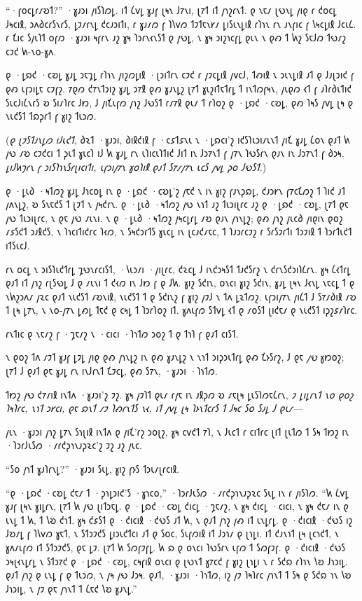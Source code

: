 “·𐑝𐑴𐑤𐑛𐑩𐑥𐑹𐑑?” ·𐑣𐑨𐑮𐑦 𐑢𐑦𐑕𐑐𐑼𐑛. 𐑦𐑑 𐑖𐑫𐑛 𐑣𐑨𐑝 𐑚𐑰𐑯 𐑓𐑳𐑯𐑦, 𐑚𐑳𐑑 𐑦𐑑 𐑢𐑪𐑟𐑩𐑯𐑑. 𐑞 𐑯𐑱𐑥 𐑚𐑻𐑯𐑛 𐑢𐑦𐑞 𐑩 𐑒𐑴𐑤𐑛 𐑓𐑰𐑤𐑦𐑙, 𐑮𐑵𐑔𐑤𐑩𐑕𐑯𐑩𐑕, 𐑛𐑲𐑥𐑩𐑯𐑛 𐑒𐑤𐑨𐑮𐑦𐑑𐑦, 𐑩 𐑣𐑨𐑥𐑼 𐑝 𐑐𐑘𐑫𐑼 𐑑𐑲𐑑𐑱𐑯𐑾𐑥 𐑛𐑦𐑕𐑧𐑯𐑛𐑦𐑙 𐑩𐑐𐑪𐑯 𐑩𐑯 𐑨𐑯𐑝𐑦𐑤 𐑝 𐑘𐑰𐑤𐑛𐑦𐑙 𐑓𐑤𐑧𐑖. 𐑩 𐑗𐑦𐑤 𐑕𐑢𐑧𐑐𐑑 𐑴𐑝𐑼 ·𐑣𐑨𐑮𐑦 𐑰𐑝𐑩𐑯 𐑨𐑟 𐑣𐑰 𐑐𐑮𐑩𐑯𐑬𐑯𐑕𐑑 𐑞 𐑢𐑻𐑛, 𐑯 𐑣𐑰 𐑮𐑦𐑟𐑪𐑤𐑝𐑛 𐑞𐑧𐑯 𐑯 𐑞𐑺 𐑑 𐑿𐑟 𐑕𐑱𐑓𐑼 𐑑𐑻𐑥𐑟 𐑤𐑲𐑒 𐑿-𐑯𐑴-𐑣𐑵.

𐑞 ·𐑛𐑸𐑒 ·𐑤𐑹𐑛 𐑣𐑨𐑛 𐑮𐑱𐑡𐑛 𐑩𐑐𐑪𐑯 𐑢𐑦𐑟𐑼𐑛𐑦𐑙 ·𐑚𐑮𐑦𐑑𐑩𐑯 𐑤𐑲𐑒 𐑩 𐑢𐑲𐑤𐑛𐑦𐑙 𐑢𐑫𐑤𐑓, 𐑑𐑺𐑦𐑙 𐑯 𐑮𐑧𐑯𐑛𐑦𐑙 𐑨𐑑 𐑞 𐑓𐑨𐑚𐑮𐑦𐑒 𐑝 𐑞𐑺 𐑧𐑝𐑮𐑦𐑛𐑱 𐑤𐑲𐑝𐑟. 𐑳𐑞𐑼 𐑒𐑳𐑯𐑑𐑮𐑦𐑟 𐑣𐑨𐑛 𐑮𐑳𐑙 𐑞𐑺 𐑣𐑨𐑯𐑛𐑟 𐑚𐑳𐑑 𐑣𐑧𐑟𐑦𐑑𐑱𐑑𐑩𐑛 𐑑 𐑦𐑯𐑑𐑼𐑝𐑰𐑯, 𐑢𐑧𐑞𐑼 𐑬𐑑 𐑝 𐑨𐑐𐑩𐑔𐑧𐑑𐑦𐑒 𐑕𐑧𐑤𐑓𐑦𐑖𐑯𐑩𐑕 𐑹 𐑕𐑦𐑥𐑐𐑩𐑤 𐑓𐑽, 𐑓 𐑢𐑦𐑗𐑧𐑝𐑼 𐑢𐑪𐑟 𐑓𐑻𐑕𐑑 𐑩𐑥𐑳𐑙 𐑞𐑧𐑥 𐑑 𐑩𐑐𐑴𐑟 𐑞 ·𐑛𐑸𐑒 ·𐑤𐑹𐑛, 𐑞𐑺 𐑐𐑰𐑕 𐑢𐑫𐑛 𐑚𐑰 𐑞 𐑯𐑧𐑒𐑕𐑑 𐑑𐑸𐑜𐑩𐑑 𐑝 𐑣𐑦𐑟 𐑑𐑧𐑮𐑼.

(\emph{𐑞 𐑚𐑲𐑕𐑑𐑨𐑯𐑛𐑼 𐑦𐑓𐑧𐑒𐑑,} 𐑔𐑷𐑑 ·𐑣𐑨𐑮𐑦, 𐑔𐑦𐑙𐑒𐑦𐑙 𐑝 ·𐑤𐑭𐑑𐑭𐑯𐑧 𐑯 ·𐑛𐑸𐑤𐑦'𐑟 𐑦𐑒𐑕𐑐𐑧𐑮𐑦𐑥𐑧𐑯𐑑 𐑢𐑦𐑗 𐑣𐑨𐑛 𐑖𐑴𐑯 𐑞𐑨𐑑 𐑿 𐑢𐑻 𐑥𐑹 𐑤𐑲𐑒𐑤𐑦 𐑑 𐑜𐑧𐑑 𐑣𐑧𐑤𐑐 𐑦𐑓 𐑿 𐑣𐑨𐑛 𐑩𐑯 𐑧𐑐𐑦𐑤𐑧𐑐𐑑𐑦𐑒 𐑓𐑦𐑑 𐑦𐑯 𐑓𐑮𐑳𐑯𐑑 𐑝 𐑢𐑳𐑯 𐑐𐑻𐑕𐑩𐑯 𐑞𐑨𐑯 𐑦𐑯 𐑓𐑮𐑳𐑯𐑑 𐑝 𐑔𐑮𐑰. \emph{𐑛𐑦𐑓𐑿𐑠𐑩𐑯 𐑝 𐑮𐑦𐑕𐑐𐑪𐑯𐑕𐑩𐑚𐑦𐑤𐑦𐑑𐑦, 𐑧𐑝𐑮𐑦𐑢𐑳𐑯 𐑣𐑴𐑐𐑦𐑙 𐑞𐑨𐑑 𐑕𐑳𐑥𐑢𐑳𐑯 𐑧𐑤𐑕 𐑢𐑫𐑛 𐑜𐑴 𐑓𐑻𐑕𐑑.})

𐑞 ·𐑛𐑧𐑔 ·𐑰𐑑𐑼𐑟 𐑣𐑨𐑛 𐑓𐑪𐑤𐑴𐑛 𐑦𐑯 𐑞 ·𐑛𐑸𐑒 ·𐑤𐑹𐑛'𐑟 𐑢𐑱𐑒 𐑯 𐑦𐑯 𐑣𐑦𐑟 𐑝𐑨𐑯𐑜𐑸𐑛, 𐑒𐑨𐑮𐑾𐑯 𐑝𐑳𐑤𐑗𐑼𐑟 𐑑 𐑐𐑦𐑒 𐑨𐑑 𐑢𐑵𐑯𐑛𐑟, 𐑹 𐑕𐑯𐑱𐑒𐑕 𐑑 𐑚𐑲𐑑 𐑯 𐑢𐑰𐑒𐑩𐑯. 𐑞 ·𐑛𐑧𐑔 ·𐑰𐑑𐑼𐑟 𐑢𐑻 𐑯𐑪𐑑 𐑨𐑟 𐑑𐑧𐑮𐑦𐑚𐑩𐑤 𐑨𐑟 𐑞 ·𐑛𐑸𐑒 ·𐑤𐑹𐑛, 𐑚𐑳𐑑 𐑞𐑱 𐑢𐑻 𐑑𐑧𐑮𐑦𐑚𐑩𐑤, 𐑯 𐑞𐑱 𐑢𐑻 𐑥𐑧𐑯𐑦. 𐑯 𐑞 ·𐑛𐑧𐑔 ·𐑰𐑑𐑼𐑟 𐑢𐑰𐑤𐑛𐑩𐑛 𐑥𐑹 𐑞𐑨𐑯 𐑢𐑪𐑯𐑛𐑟; 𐑞𐑺 𐑢𐑪𐑟 𐑢𐑧𐑤𐑔 𐑢𐑦𐑞𐑦𐑯 𐑞𐑴𐑟 𐑥𐑭𐑕𐑒𐑑 𐑮𐑨𐑙𐑒𐑕, 𐑯 𐑐𐑪𐑤𐑦𐑑𐑦𐑒𐑩𐑤 𐑐𐑬𐑼, 𐑯 𐑕𐑰𐑒𐑮𐑩𐑑𐑕 𐑣𐑧𐑤𐑛 𐑦𐑯 𐑚𐑤𐑨𐑒𐑥𐑱𐑤, 𐑑 𐑐𐑨𐑮𐑩𐑤𐑲𐑟 𐑩 𐑕𐑩𐑕𐑲𐑩𐑑𐑦 𐑑𐑮𐑲𐑦𐑙 𐑑 𐑐𐑮𐑩𐑑𐑧𐑒𐑑 𐑦𐑑𐑕𐑧𐑤𐑓.

𐑩𐑯 𐑴𐑤𐑛 𐑯 𐑮𐑦𐑕𐑐𐑧𐑒𐑑𐑩𐑛 𐑡𐑻𐑯𐑩𐑤𐑦𐑕𐑑, ·𐑘𐑧𐑮𐑥𐑦 ·𐑢𐑦𐑚𐑩𐑤, 𐑒𐑷𐑤𐑛 𐑓 𐑦𐑯𐑒𐑮𐑰𐑕𐑑 𐑑𐑨𐑒𐑕𐑩𐑟 𐑯 𐑒𐑩𐑯𐑕𐑒𐑮𐑦𐑐𐑖𐑩𐑯. 𐑣𐑰 𐑖𐑬𐑑𐑩𐑛 𐑞𐑨𐑑 𐑦𐑑 𐑢𐑪𐑟 𐑩𐑚𐑕𐑻𐑛 𐑓 𐑞 𐑥𐑧𐑯𐑦 𐑑 𐑒𐑬𐑼 𐑦𐑯 𐑓𐑽 𐑝 𐑞 𐑓𐑿. 𐑣𐑦𐑟 𐑕𐑒𐑦𐑯, 𐑴𐑯𐑤𐑦 𐑣𐑦𐑟 𐑕𐑒𐑦𐑯, 𐑣𐑨𐑛 𐑚𐑰𐑯 𐑓𐑬𐑯𐑛 𐑯𐑱𐑤𐑛 𐑑 𐑞 𐑯𐑿𐑟𐑮𐑵𐑥 𐑢𐑷𐑤 𐑞𐑨𐑑 𐑯𐑧𐑒𐑕𐑑 𐑥𐑹𐑯𐑦𐑙, 𐑯𐑧𐑒𐑕𐑑 𐑑 𐑞 𐑕𐑒𐑦𐑯𐑟 𐑝 𐑣𐑦𐑟 𐑢𐑲𐑓 𐑯 𐑑𐑵 𐑛𐑷𐑑𐑼𐑟. 𐑧𐑝𐑮𐑦𐑢𐑳𐑯 𐑢𐑦𐑖𐑑 𐑓 𐑕𐑳𐑥𐑔𐑦𐑙 𐑥𐑹 𐑑 𐑚𐑰 𐑛𐑳𐑯, 𐑯 𐑯𐑴-𐑢𐑳𐑯 𐑛𐑺𐑛 𐑑𐑱𐑒 𐑞 𐑤𐑰𐑛 𐑑 𐑐𐑮𐑩𐑐𐑴𐑟 𐑦𐑑. 𐑣𐑵𐑧𐑝𐑼 𐑕𐑑𐑫𐑛 𐑬𐑑 𐑞 𐑥𐑴𐑕𐑑 𐑚𐑦𐑒𐑱𐑥 𐑞 𐑯𐑧𐑒𐑕𐑑 𐑦𐑜𐑟𐑭𐑥𐑐𐑩𐑤.

𐑩𐑯𐑑𐑦𐑤 𐑞 𐑯𐑱𐑥𐑟 𐑝 ·𐑡𐑱𐑥𐑟 𐑯 ·𐑤𐑦𐑤𐑦 ·𐑐𐑪𐑑𐑼 𐑮𐑴𐑟 𐑑 𐑞 𐑑𐑪𐑐 𐑝 𐑞𐑨𐑑 𐑤𐑦𐑕𐑑.

𐑯 𐑞𐑴𐑟 𐑑𐑵 𐑥𐑲𐑑 𐑣𐑨𐑝 𐑛𐑲𐑛 𐑢𐑦𐑞 𐑞𐑺 𐑢𐑪𐑯𐑛𐑟 𐑦𐑯 𐑞𐑺 𐑣𐑨𐑯𐑛𐑟 𐑯 𐑯𐑪𐑑 𐑮𐑦𐑜𐑮𐑧𐑑𐑩𐑛 𐑞𐑺 𐑗𐑶𐑕𐑩𐑟, 𐑓 𐑞𐑱 \emph{𐑢𐑻} 𐑣𐑽𐑴𐑟; 𐑚𐑳𐑑 𐑓 𐑞𐑨𐑑 𐑞𐑱 𐑣𐑨𐑛 𐑩𐑯 𐑦𐑯𐑓𐑩𐑯𐑑 𐑗𐑲𐑤𐑛, 𐑞𐑺 𐑕𐑳𐑯, ·𐑣𐑨𐑮𐑦 ·𐑐𐑪𐑑𐑼.

𐑑𐑽𐑟 𐑢𐑻 𐑒𐑳𐑥𐑦𐑙 𐑦𐑯𐑑𐑵 ·𐑣𐑨𐑮𐑦'𐑟 𐑲𐑟. 𐑣𐑰 𐑢𐑲𐑐𐑑 𐑞𐑧𐑥 𐑩𐑢𐑱 𐑦𐑯 𐑨𐑙𐑜𐑼 𐑹 𐑥𐑱𐑚𐑰 𐑛𐑧𐑕𐑐𐑼𐑱𐑖𐑩𐑯, \emph{𐑲 𐑛𐑦𐑛𐑩𐑯𐑑 𐑯𐑴 𐑞𐑴𐑟 𐑐𐑰𐑐𐑩𐑤, 𐑯𐑪𐑑 𐑮𐑾𐑤𐑦, 𐑞𐑱 𐑸𐑯𐑑 𐑥𐑲 𐑐𐑺𐑩𐑯𐑑𐑕 \emph{𐑯𐑬}, 𐑦𐑑 𐑢𐑫𐑛 𐑚𐑰 𐑐𐑶𐑯𐑑𐑤𐑩𐑕 𐑑 𐑓𐑰𐑤 𐑕𐑴 𐑕𐑨𐑛 𐑓 𐑞𐑧𐑥—}

𐑢𐑧𐑯 ·𐑣𐑨𐑮𐑦 𐑢𐑪𐑟 𐑛𐑳𐑯 𐑕𐑪𐑚𐑦𐑙 𐑦𐑯𐑑𐑵 𐑞 𐑢𐑦𐑗'𐑩𐑟 𐑮𐑴𐑚𐑟, 𐑣𐑰 𐑤𐑫𐑒𐑑 𐑳𐑐, 𐑯 𐑓𐑧𐑤𐑑 𐑩 𐑤𐑦𐑑𐑩𐑤 𐑚𐑦𐑑 𐑚𐑧𐑑𐑼 𐑑 𐑕𐑰 𐑑𐑽𐑟 𐑦𐑯 ·𐑐𐑮𐑩𐑓𐑧𐑕𐑼 ·𐑥𐑩𐑒𐑜𐑪𐑯𐑨𐑜𐑷𐑤'𐑟 𐑲𐑟 𐑨𐑟 𐑢𐑧𐑤.

“𐑕𐑴 𐑢𐑪𐑑 𐑣𐑨𐑐𐑩𐑯𐑛?” ·𐑣𐑨𐑮𐑦 𐑕𐑧𐑛, 𐑣𐑦𐑟 𐑝𐑶𐑕 𐑑𐑮𐑧𐑥𐑚𐑩𐑤𐑦𐑙.

“𐑞 ·𐑛𐑸𐑒 ·𐑤𐑹𐑛 𐑒𐑱𐑥 𐑑 ·𐑜𐑪𐑛𐑮𐑦𐑒'𐑕 ·𐑣𐑪𐑤𐑴,” ·𐑐𐑮𐑩𐑓𐑧𐑕𐑼 ·𐑥𐑩𐑒𐑜𐑪𐑯𐑨𐑜𐑷𐑤 𐑕𐑧𐑛 𐑦𐑯 𐑩 𐑢𐑦𐑕𐑐𐑼. “𐑿 𐑖𐑫𐑛 𐑣𐑨𐑝 𐑚𐑰𐑯 𐑣𐑦𐑛𐑩𐑯, 𐑚𐑳𐑑 𐑿 𐑢𐑻 𐑚𐑦𐑑𐑮𐑱𐑛. 𐑞 ·𐑛𐑸𐑒 ·𐑤𐑹𐑛 𐑒𐑦𐑤𐑛 ·𐑡𐑱𐑥𐑟, 𐑯 𐑣𐑰 𐑒𐑦𐑤𐑛 ·𐑤𐑦𐑤𐑦, 𐑯 𐑣𐑰 𐑒𐑱𐑥 𐑦𐑯 𐑞 𐑧𐑯𐑛 𐑑 𐑿, 𐑑 𐑘𐑹 𐑒𐑪𐑑. 𐑣𐑰 𐑒𐑭𐑕𐑑 𐑞 ·𐑒𐑦𐑤𐑦𐑙 ·𐑒𐑻𐑕 𐑨𐑑 𐑿, 𐑯 𐑞𐑨𐑑 𐑢𐑪𐑟 𐑢𐑺 𐑦𐑑 𐑧𐑯𐑛𐑩𐑛. 𐑞 ·𐑒𐑦𐑤𐑦𐑙 ·𐑒𐑻𐑕 𐑦𐑟 𐑓𐑹𐑥𐑛 𐑝 𐑐𐑘𐑫𐑼 𐑣𐑱𐑑, 𐑯 𐑕𐑑𐑮𐑲𐑒𐑕 𐑛𐑦𐑮𐑧𐑒𐑑𐑤𐑦 𐑨𐑑 𐑞 𐑕𐑴𐑤, 𐑕𐑧𐑝𐑼𐑦𐑙 𐑦𐑑 𐑓𐑮𐑪𐑥 𐑞 𐑚𐑪𐑛𐑦. 𐑦𐑑 𐑒𐑨𐑯𐑪𐑑 𐑚𐑰 𐑚𐑤𐑪𐑒𐑑, 𐑯 𐑣𐑵𐑥𐑧𐑝𐑼 𐑦𐑑 𐑕𐑑𐑮𐑲𐑒𐑕, 𐑞𐑱 𐑛𐑲. 𐑚𐑳𐑑 𐑿 𐑕𐑼𐑝𐑲𐑝𐑛. 𐑿 𐑸 𐑞 𐑴𐑯𐑤𐑦 𐑐𐑻𐑕𐑩𐑯 𐑧𐑝𐑼 𐑑 𐑕𐑼𐑝𐑲𐑝. 𐑞 ·𐑒𐑦𐑤𐑦𐑙 ·𐑒𐑻𐑕 𐑮𐑰𐑚𐑬𐑯𐑛𐑩𐑛 𐑯 𐑕𐑑𐑮𐑳𐑒 𐑞 ·𐑛𐑸𐑒 ·𐑤𐑹𐑛, 𐑤𐑰𐑝𐑦𐑙 𐑴𐑯𐑤𐑦 𐑞 𐑚𐑻𐑯𐑑 𐑣𐑳𐑤𐑒 𐑝 𐑣𐑦𐑟 𐑚𐑪𐑛𐑦 𐑯 𐑩 𐑕𐑒𐑸 𐑩𐑐𐑪𐑯 𐑘𐑹 𐑓𐑪𐑮𐑦𐑛. 𐑞𐑨𐑑 𐑢𐑪𐑟 𐑞 𐑧𐑯𐑛 𐑝 𐑞 𐑑𐑧𐑮𐑼, 𐑯 𐑢𐑰 𐑢𐑻 𐑓𐑮𐑰. 𐑞𐑨𐑑, ·𐑣𐑨𐑮𐑦 ·𐑐𐑪𐑑𐑼, 𐑦𐑟 𐑢𐑲 𐑐𐑰𐑐𐑩𐑤 𐑢𐑪𐑯𐑑 𐑑 𐑕𐑰 𐑞 𐑕𐑒𐑸 𐑪𐑯 𐑘𐑹 𐑓𐑪𐑮𐑦𐑛, 𐑯 𐑢𐑲 𐑞𐑱 𐑢𐑪𐑯𐑑 𐑑 𐑖𐑱𐑒 𐑘𐑹 𐑣𐑨𐑯𐑛.”


